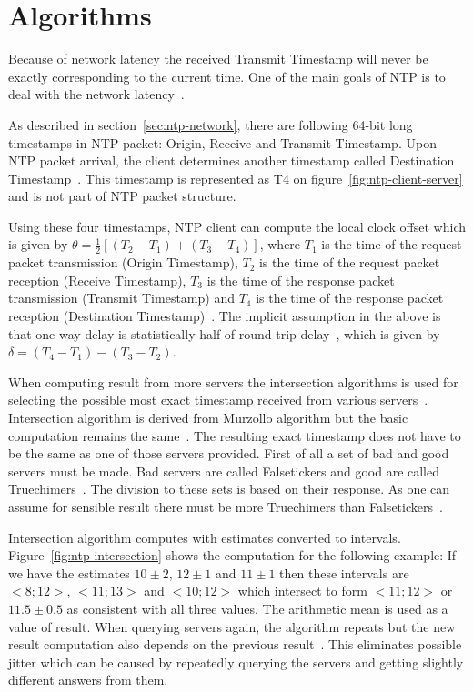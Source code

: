 
\section{Algorithms}\label{sec:ntp-algorithms}
Because of network latency the received Transmit Timestamp will never be exactly
corresponding to the current time.
One of the main goals of NTP is to deal with the network latency~\cite{ntp-overview}.

As described in section~\ref{sec:ntp-network},
there are following 64-bit long timestamps in NTP packet: Origin, Receive and Transmit Timestamp.
Upon NTP packet arrival, the client determines another timestamp called
Destination Timestamp~\cite{rfc5905}.
This timestamp is represented as T4 on figure~\ref{fig:ntp-client-server}
and is not part of NTP packet structure.

Using these four timestamps, NTP client can compute
the local clock offset which is given by $\theta = \frac{1}{2}[(T_2 - T_1) + (T_3 - T_4)]$,
where $T_1$ is the time of the request packet transmission (Origin Timestamp),
$T_2$ is the time of the request packet reception (Receive Timestamp),
$T_3$ is the time of the response packet transmission (Transmit Timestamp) and
$T_4$ is the time of the response packet reception (Destination Timestamp)~\cite{ntp-algor,rfc5905}.
The implicit assumption in the above is that one-way delay is
statistically half of round-trip delay~\cite{rfc5905},
which is given by $\delta = (T_4 - T_1) - (T_3 - T_2)$.

When computing result from more servers the intersection algorithms is used
for selecting the possible most exact timestamp received from various servers~\cite{rfc5905}.
Intersection algorithm is derived from Murzollo algorithm but the basic
computation remains the same~\cite{ntp-history}.
The resulting exact timestamp does not have to be the same
as one of those servers provided.
First of all a set of bad and good servers must be made.
Bad servers are called Falsetickers and good are called Truechimers~\cite{rfc5905}.
The division to these sets is based on their response.
As one can assume for sensible result there must be more Truechimers than Falsetickers~\cite{rfc5905}.

Intersection algorithm computes with estimates converted to intervals.
Figure~\ref{fig:ntp-intersection} shows the computation for the following example:
If we have the estimates $10 \pm 2$, $12 \pm 1$ and $11 \pm 1$
then these intervals are $<8; 12>$, $<11; 13>$ and $<10; 12>$ which
intersect to form $<11; 12>$ or $11.5 \pm 0.5$ as consistent with all three values.
The arithmetic mean is used as a value of result.
When querying servers again, the algorithm repeats but the new result computation
also depends on the previous result~\cite{rfc5905}.
This eliminates possible jitter which can be caused by repeatedly querying the servers
and getting slightly different answers from them.

